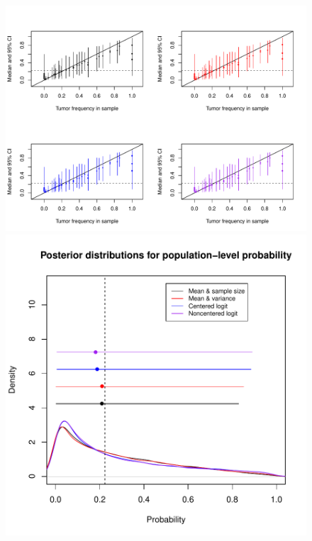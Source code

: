 \documentclass[12pt, oneside, titlepage]{article}   	%
\begin{document}
 \begin{figure}[h]
   \centering
         \includegraphics[page=1,width=.75\textwidth]{../../figures/appendix/appendix-1/shrinkage}              
       \includegraphics[page=1,width=.75\textwidth]{../../figures/appendix/appendix-1/posteriorProbability}              
    \caption{   }
 \label{fig:...}
\end{figure}


\clearpage

\end{document}
